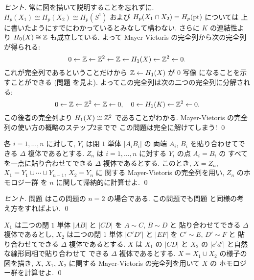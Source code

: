 \documentclass[12pt,twoside]{jarticle}
\begin{document}
\begin{proof}[ヒント]
  常に図を描いて説明することを忘れずに.
  $H_p(X_1)\cong H_p(X_2)\cong H_p(S^1)$ 
  および $H_p(X_1\cap X_2)=H_p(\mathop{\mathrm{pt}})$ については
  上に書いたようにすでにわかっているとみなして構わない.
  さらに $K$ の連結性より $H_0(X)\cong{\mathbb Z}$ も成立している.
  よって Mayer-Vietoris の完全列から次の完全列が得られる:
  \begin{equation*}
    0
    \leftarrow {\mathbb Z}
    \leftarrow {\mathbb Z}^2
    \leftarrow {\mathbb Z}
    \leftarrow H_1(X)
    \leftarrow {\mathbb Z}^2
    \leftarrow 0.
  \end{equation*}
  これが完全列であるということだけから ${\mathbb Z}\leftarrow H_1(X)$ が $0$ 写像
  になることを示すことができる
  (問題  を見よ).
  よってこの完全列は次の二つの完全列に分解される:
  \begin{equation*}
    0
    \leftarrow {\mathbb Z}
    \leftarrow {\mathbb Z}^2
    \leftarrow {\mathbb Z}
    \leftarrow 0,
    \quad
    0
    \leftarrow H_1(K)
    \leftarrow {\mathbb Z}^2
    \leftarrow 0.
  \end{equation*}
  この後者の完全列より $H_1(X)\cong{\mathbb Z}^2$ であることがわかる.
  Mayer-Vietoris の完全列の使い方の概略のステップ2までで
  この問題は完全に解けてしまう!
  \qed
\end{proof}

\begin{question}[ブーケ]
  各 $i=1,\ldots,n$ に対して, $Y_i$ は閉 $1$ 単体 $|A_iB_i|$ の
  両端 $A_i$, $B_i$ を貼り合わせてできる $\Delta$ 複体であるとする.
  $Z_n$ は $i=1,\ldots,n$ に対する $Y_i$ の点 $A_i=B_i$ の
  すべてを一点に貼り合わせてできる $\Delta$ 複体であるとする.
  このとき, $X=Z_n$, $X_1=Y_1\cup\cdots\cup Y_{n-1}$, $X_2=Y_n$ に
  関する Mayer-Vietoris の完全列を用い, $Z_n$ のホモロジー群
  を $n$ に関して帰納的に計算せよ.
  \qed
\end{question}

\begin{proof}[ヒント]
  問題  はこの問題の $n=2$ の場合である.
  この問題でも問題  と同様の考え方をすればよい.
  \qed
\end{proof}

\begin{question}[日1]
  \label{q:hi-1}
  $X_1$ は二つの閉 $1$ 単体 $|AB|$ と $|CD|$ を $A\sim C$, $B\sim D$ と
  貼り合わせてできる $\Delta$ 複体であるとし, 
  $X_2$ は二つの閉 $1$ 単体 $|C'D'|$ と $|EF|$ を $C'\sim E$, $D'\sim F$ と
  貼り合わせてできる $\Delta$ 複体であるとする.
  $X$ は $X_1$ の $|CD|$ と $X_2$ の $|c'd'|$ と自然な線形同相で貼り合わせて
  できる $\Delta$ 複体であるとする. $X=X_1\cup X_2$ の様子の図を描き, 
  $X$, $X_1$, $X_2$ に関する Mayer-Vietoris の完全列を用いて $X$ の
  ホモロジー群を計算せよ. 
  \qed
\end{question}
\end{document}
